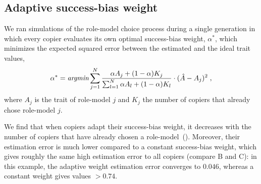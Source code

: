 \documentclass[12pt]{extarticle}
\begin{document}
\subsection*{Adaptive success-bias weight}

We ran simulations of the role-model choice process during a single generation in which every copier evaluates its own optimal success-bias weight, $\alpha^*$, which minimizes the expected squared error between the estimated and the ideal trait values,
\begin{equation}
\alpha^* = \emph{argmin} \sum_{j=1}^N\frac{\alpha A_j + (1-\alpha) K_j}{\sum_{l=1}^N\alpha A_l + (1-\alpha) K_l}\cdot (\hat{A}-A_j)^2 \;,
\end{equation}
where $A_j$ is the trait of role-model $j$ and $K_j$ the number of copiers that already chose role-model $j$.

We find that when copiers adapt their success-bias weight, it decreases with the number of copiers that have already chosen a role-model~().
Moreover, their estimation error is much lower compared to a constant success-bias weight, which gives roughly the same high estimation error to all copiers (compare B and C): in this example, the adaptive weight estimation error converges to $0.046$, whereas a constant weight gives values $>0.74$.
\end{document}
